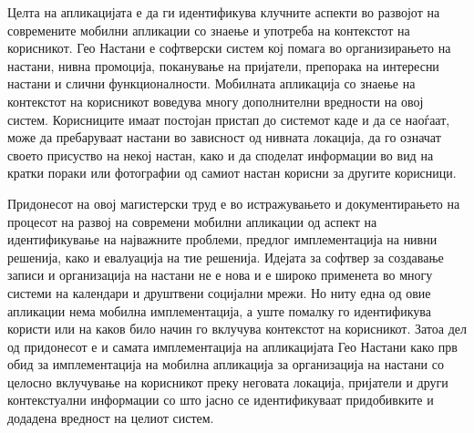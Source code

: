 Целта на апликацијата е да ги идентификува клучните аспекти во развојот на
современите мобилни апликации со знаење и употреба на контекстот на корисникот.
Гео Настани е софтверски систем кој помага во организирањето на настани, нивна
промоција, поканување на пријатели, препорака на интересни настани и слични
функционалности. Мобилната апликација со знаење на контекстот на корисникот
воведува многу дополнителни вредности на овој систем. Корисниците имаат постојан
пристап до системот каде и да се наоѓаат, може да пребаруваат настани во
зависност од нивната локација, да го означат своето присуство на некој настан,
како и да споделат информации во вид на кратки пораки или фотографии од самиот
настан корисни за другите корисници.

Придонесот на овој магистерски труд е во истражувањето и документирањето на
процесот на развој на современи мобилни апликации од аспект на идентификување на
најважните проблеми, предлог имплементација на нивни решенија, како и евалуација
на тие решенија. Идејата за софтвер за создавање записи и организација на
настани не е нова и е широко применета во многу системи на календари и друштвени
социјални мрежи. Но ниту една од овие апликации нема мобилна имплементација, а
уште помалку го идентификува користи или на каков било начин го вклучува
контекстот на корисникот. Затоа дел од придонесот е и самата имплементација на
апликацијата Гео Настани како прв обид за имплементација на мобилна апликација
за организација на настани со целосно вклучување на корисникот преку неговата
локација, пријатели и други контекстуални информации со што јасно се
идентификуваат придобивките и додадена вредност на целиот систем.

